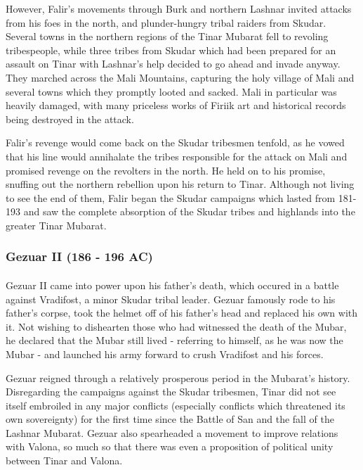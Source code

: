 					However, Falir's movements through Burk and northern Lashnar invited attacks from his foes in the north, and plunder-hungry tribal raiders from Skudar. Several towns in the northern regions of the Tinar Mubarat fell to revoling tribespeople, while three tribes from Skudar which had been prepared for an assault on Tinar with Lashnar's help decided to go ahead and invade anyway. They marched across the Mali Mountains, capturing the holy village of Mali and several towns which they promptly looted and sacked. Mali in particular was heavily damaged, with many priceless works of Firiik art and historical records being destroyed in the attack.
					
					Falir's revenge would come back on the Skudar tribesmen tenfold, as he vowed that his line would annihalate the tribes responsible for the attack on Mali and promised revenge on the revolters in the north. He held on to his promise, snuffing out the northern rebellion upon his return to Tinar. Although not living to see the end of them, Falir began the Skudar campaigns which lasted from 181-193 and saw the complete absorption of the Skudar tribes and highlands into the greater Tinar Mubarat.
			\subsubsection{Gezuar II (186 - 196 AC)}
				\paragraph{}
					Gezuar II came into power upon his father's death, which occured in a battle against Vradifost, a minor Skudar tribal leader. Gezuar famously rode to his father's corpse, took the helmet off of his father's head and replaced his own with it. Not wishing to dishearten those who had witnessed the death of the Mubar, he declared that the Mubar still lived - referring to himself, as he was now the Mubar - and launched his army forward to crush Vradifost and his forces.
					
					Gezuar reigned through a relatively prosperous period in the Mubarat's history. Disregarding the campaigns against the Skudar tribesmen, Tinar did not see itself embroiled in any major conflicts (especially conflicts which threatened its own sovereignty) for the first time since the Battle of San and the fall of the Lashnar Mubarat. Gezuar also spearheaded a movement to improve relations with Valona, so much so that there was even a proposition of political unity between Tinar and Valona.
					
